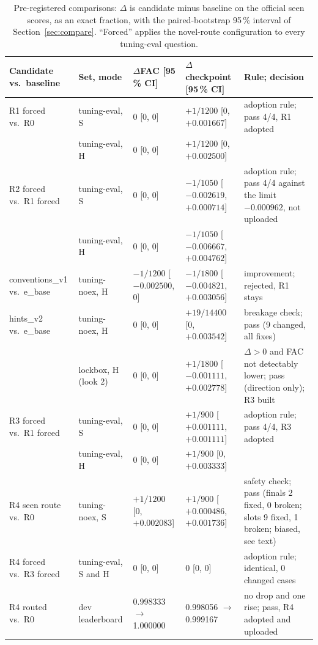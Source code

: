 \begin{table}[t]
\caption{Pre-registered comparisons: $\Delta$ is candidate minus baseline on the official seen scores, as an exact fraction, with the paired-bootstrap 95\,\% interval of Section~\ref{sec:compare}. ``Forced'' applies the novel-route configuration to every tuning-eval question.}
\label{tab:decisions}
\centering
\scriptsize
\setlength{\tabcolsep}{3pt}
\begin{tabular}{@{}llllp{5.4cm}@{}}
\toprule
Candidate vs.\ baseline & Set, mode & $\Delta$FAC [95\,\% CI] & $\Delta$checkpoint [95\,\% CI] & Rule; decision \\
\midrule
R1 forced vs.\ R0 & tuning-eval, S & 0 [0, 0] & $+1/1200$ [0, $+0.001667$] & adoption rule; pass 4/4, R1 adopted \\
 & tuning-eval, H & 0 [0, 0] & $+1/1200$ [0, $+0.002500$] & \\
R2 forced vs.\ R1 forced & tuning-eval, S & 0 [0, 0] & $-1/1050$ [$-0.002619$, $+0.000714$] & adoption rule; pass 4/4 against the limit $-0.000962$, not uploaded \\
 & tuning-eval, H & 0 [0, 0] & $-1/1050$ [$-0.006667$, $+0.004762$] & \\
conventions\_v1 vs.\ e\_base & tuning-noex, H & $-1/1200$ [$-0.002500$, 0] & $-1/1800$ [$-0.004821$, $+0.003056$] & improvement; rejected, R1 stays \\
hints\_v2 vs.\ e\_base & tuning-noex, H & 0 [0, 0] & $+19/14400$ [0, $+0.003542$] & breakage check; pass (9 changed, all fixes) \\
 & lockbox, H (look 2) & 0 [0, 0] & $+1/1800$ [$-0.001111$, $+0.002778$] & $\Delta>0$ and FAC not detectably lower; pass (direction only); R3 built \\
R3 forced vs.\ R1 forced & tuning-eval, S & 0 [0, 0] & $+1/900$ [$+0.001111$, $+0.001111$] & adoption rule; pass 4/4, R3 adopted \\
 & tuning-eval, H & 0 [0, 0] & $+1/900$ [0, $+0.003333$] & \\
R4 seen route vs.\ R0 & tuning-noex, S & $+1/1200$ [0, $+0.002083$] & $+1/900$ [$+0.000486$, $+0.001736$] & safety check; pass (finals 2 fixed, 0 broken; slots 9 fixed, 1 broken; biased, see text) \\
R4 forced vs.\ R3 forced & tuning-eval, S and H & 0 [0, 0] & 0 [0, 0] & adoption rule; identical, 0 changed cases \\
R4 routed vs.\ R0 & dev leaderboard & 0.998333 $\to$ 1.000000 & 0.998056 $\to$ 0.999167 & no drop and one rise; pass, R4 adopted and uploaded \\
\bottomrule
\end{tabular}
\end{table}
